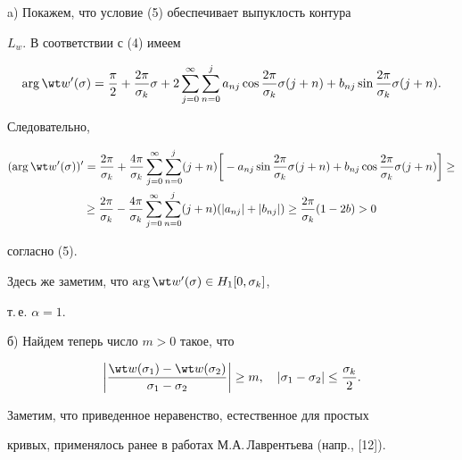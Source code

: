 a) Покажем, что условие (5) обеспечивает выпуклость контура


$L_w$. В соответствии с (4) имеем


$$


\arg \wt w'(\sigma) = \frac{\pi}{2} + \frac{2\pi}{\sigma_k} \sigma + 2


\sum_{j = 0}^{\infty} \sum_{n = 0}^j a_{nj}


\cos\frac{2\pi}{\sigma_k}\sigma (j + n) +


b_{nj}\sin\frac{2\pi}{\sigma_k}\sigma (j + n).


$$


Следовательно,


\begin{multline*}


(\arg \wt w'(\sigma))' = \frac{2\pi}{\sigma_k} +


\frac{4\pi}{\sigma_k} \sum_{j = 0}^{\infty} \sum_{n = 0}^j


(j +n) \bigg[- a_{nj}\sin\frac{2\pi}{\sigma_k} \sigma (j + n)


+ b_{nj}\cos\frac{2\pi}{\sigma_k} \sigma (j + n)\bigg] \geq \\


%


\geq \frac{2\pi}{\sigma_k} - \frac{4\pi}{\sigma_k} \sum_{j =


0}^{\infty} \sum_{n = 0}^j (j + n)(|a_{nj}| + |b_{nj}|)


\geq \frac{2\pi}{\sigma_k}(1 - 2b) > 0


\end{multline*}


согласно (5).





Здесь же заметим, что $\arg \wt w'(\sigma) \in H_1[0,\sigma_k]$,


т.\,е. $\alpha = 1$.





б) Найдем теперь число $m > 0$ такое, что


$$


\bigg|\frac{\wt w(\sigma_1) - \wt w(\sigma_2)}{\sigma_1 -


\sigma_2}\bigg| \geq m,


\quad |\sigma_1 - \sigma_2| \leq \frac{\sigma_k}{2}.


$$


Заметим, что приведенное неравенство, естественное для простых


кривых, применялось ранее в работах М.А.\,Лаврентьева (напр., [12]).






